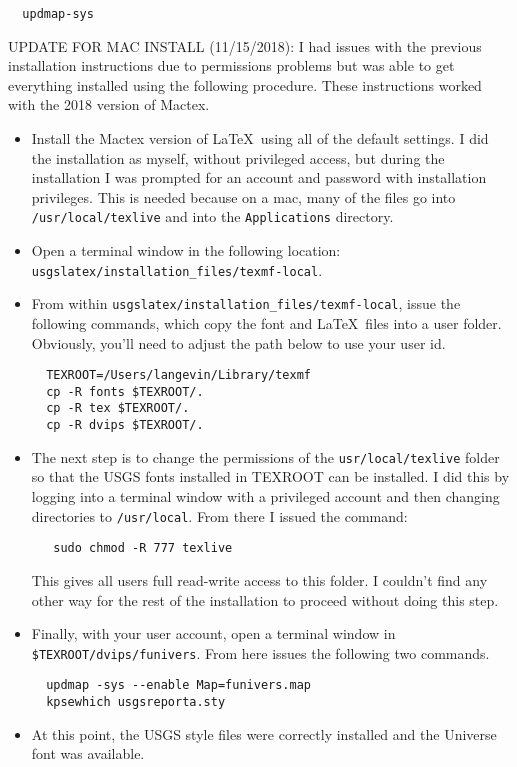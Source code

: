 \documentclass[11pt]{article}
\begin{document}
\begin{verbatim}
  updmap-sys
\end{verbatim}

UPDATE FOR MAC INSTALL (11/15/2018): I had issues with the previous installation instructions due to permissions problems but was able to get everything installed using the following procedure.  These instructions worked with the 2018 version of Mactex.

\begin{itemize}

\item Install the Mactex version of \LaTeX\ using all of the default settings.  I did the installation as myself, without privileged access, but during the installation I was prompted for an account and password with installation privileges.  This is needed because on a mac, many of the files go into \texttt{/usr/local/texlive} and into the \texttt{Applications} directory.

\item Open a terminal window in the following location: \texttt{usgslatex/installation\_files/texmf-local}.

\item From within \texttt{usgslatex/installation\_files/texmf-local}, issue the following commands, which copy the font and \LaTeX\ files into a user folder.  Obviously, you'll need to adjust the path below to use your user id.
\begin{verbatim}
  TEXROOT=/Users/langevin/Library/texmf
  cp -R fonts $TEXROOT/.
  cp -R tex $TEXROOT/.
  cp -R dvips $TEXROOT/.
\end{verbatim}

\item The next step is to change the permissions of the \texttt{usr/local/texlive} folder so that the USGS fonts installed in TEXROOT can be installed.  I did this by logging into a terminal window with a privileged account and then changing directories to \texttt{/usr/local}.  From there I issued the command:
\begin{verbatim}
   sudo chmod -R 777 texlive
\end{verbatim}
This gives all users full read-write access to this folder.  I couldn't find any other way for the rest of the installation to proceed without doing this step.

\item Finally, with your user account, open a terminal window in \texttt{\$TEXROOT/dvips/funivers}.  From here issues the following two commands.

\begin{verbatim}
  updmap -sys --enable Map=funivers.map
  kpsewhich usgsreporta.sty
\end{verbatim}

\item At this point, the USGS style files were correctly installed and the Universe font was available. 

\end{itemize}
\end{document}
